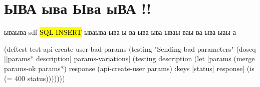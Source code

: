 \chapter{ЫВА ыва Ыва ыВА !!}

ываыва sdf \hl{SQL INSERT} ываыва ыва ы ва ыва ыва ываы ваы ва ыва ыаы а


\begin{code}
(deftest test-api-create-user-bad-params
  (testing "Sending bad parameters"
    (doseq [[params* description] params-variations]
      (testing description
        (let [params (merge params-ok params*)
              response (api-create-user params)
              {:keys [status]} response]
          (is (= 400 status)))))))
\end{code}

